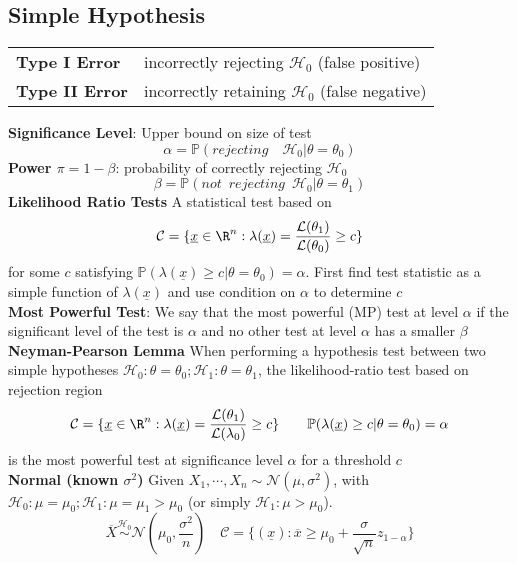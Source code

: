 \documentclass[8pt]{article}
\begin{document}
\begin{multicols}{3}
{   \subsection*{Simple Hypothesis}
   \begin{tabular}{l l}
     \textbf{Type I Error} & incorrectly rejecting $\mathcal{H}_0$ (false positive)\\
     \textbf{Type II Error} & incorrectly retaining $\mathcal{H}_0$ (false negative)
   \end{tabular}
   $ $\\
   \textbf{Significance Level}: Upper bound on size of test
   \[
    \alpha = \mathbb{P}(rejecting \quad \mathcal{H}_0 | \theta = \theta_0)
   \]
   \textbf{Power $\pi = 1-\beta$}: probability of correctly rejecting $\mathcal{H}_0$
   \[
    \beta = \mathbb{P}(not \enspace rejecting \enspace \mathcal{H}_0 | \theta = \theta_1)
   \]
   \textbf{Likelihood Ratio Tests} A statistical test based on
   \[
    \mathcal{C} = \{ \underline{x}\in\R^n : \lambda(\underline{x}) = \frac{\mathcal{L}(\theta_1)}{\mathcal{L}(\theta_0)} \geq c \}
   \]
   for some $c$ satisfying $\mathbb{P}(\lambda(\underline{x}) \geq c | \theta = \theta_0) = \alpha$. First find test statistic as a simple function of $\lambda(\underline{x})$ and use condition on $\alpha$ to determine $c$\\
   \textbf{Most Powerful Test}: We say that the most powerful (MP) test at level $\alpha$ if the significant level of the test is $\alpha$ and no other test at level $\alpha$ has a smaller $\beta$\\
   \textbf{Neyman-Pearson Lemma} When performing a hypothesis test between two simple hypotheses $\mathcal{H}_0: \theta = \theta_0; \mathcal{H}_1: \theta = \theta_1$, the likelihood-ratio test based on rejection region
   \[
     \mathcal{C} = \{ \underline{x}\in\R^n : \lambda(\underline{x}) = \frac{\mathcal{L}(\theta_1)}{\mathcal{L}(\lambda_0)} \geq c \} \quad \quad \mathbb{P}(\lambda(\underline{x}) \geq c | \theta = \theta_0) = \alpha
   \]
   is the most powerful test at significance level $\alpha$ for a threshold $c$\\
   \textbf{Normal (known $\sigma^2$)} Given $X_1, \cdots, X_n \sim \mathcal{N}(\mu, \sigma^2)$, with $\mathcal{H}_0: \mu = \mu_0; \mathcal{H}_1: \mu = \mu_1 > \mu_0$ (or simply $\mathcal{H}_1: \mu > \mu_0$).
   \[
    \overline{X} \stackrel{\mathcal{H}_0}{\sim} \mathcal{N} (\mu_0, \frac{\sigma^2}{n}) \quad   \mathcal{C} = \{ (\underline{x}) : \overline{x} \geq \mu_0 + \frac{\sigma}{\sqrt{n}}  z_{1-\alpha}\}
\]}
\end{multicols}
\end{document}
